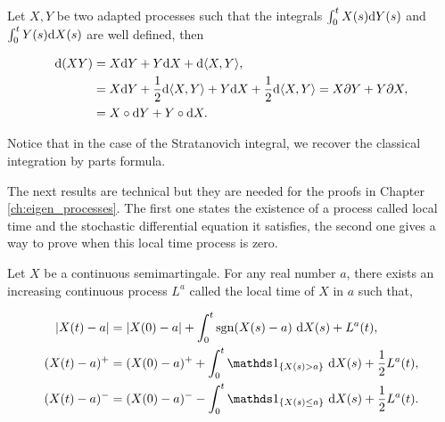 \begin{theorem} \label{thm:partes} %
    Let $X, Y$ be two adapted processes such that the integrals $\int_0^t X(s) \mathrm d Y(s)$ and $\int_0^t Y(s) \mathrm d X(s)$ are well defined, then

    \begin{align*}
        \mathrm d(XY) &= X \mathrm d Y + Y \mathrm d X + \mathrm d \langle X, Y \rangle,\\
        &= X \mathrm d Y + \frac12 \mathrm d \langle X, Y \rangle + Y \mathrm d X + \frac12 \mathrm d \langle X, Y \rangle = X \partial Y + Y \partial X,\\  
        &= X \circ \mathrm d Y + Y \circ \mathrm d X.
    \end{align*}
\end{theorem}

Notice that in the case of the Stratanovich integral, we recover the classical integration by parts formula.



The next results are technical but they are needed for the proofs in Chapter \ref{ch:eigen_processes}. The first one states the existence of a process called local time and the stochastic differential equation it satisfies, the second one gives a way to prove when this local time process is zero.


\begin{theorem} 
    Let $X$ be a continuous semimartingale. For any real number $a$, there exists an increasing continuous process $L^a$ called the local time of $X$ in $a$ such that,


    \begin{align*}
        \abs{X(t) - a} &= \abs{X(0) - a} + \int_0^t \mathrm{sgn}(X(s) - a)~\d X(s) + L^a(t),\\
        (X(t) - a)^+ &= (X(0) - a)^+ + \int_0^t \mathds 1_{\{X(s) > a\}}~\d X(s) + \frac12 L^a(t),\\
        (X(t) - a)^- &= (X(0) - a)^- - \int_0^t \mathds 1_{\{X(s) \le a\}}~\d X(s) + \frac12 L^a(t).
    \end{align*}

\end{theorem}


